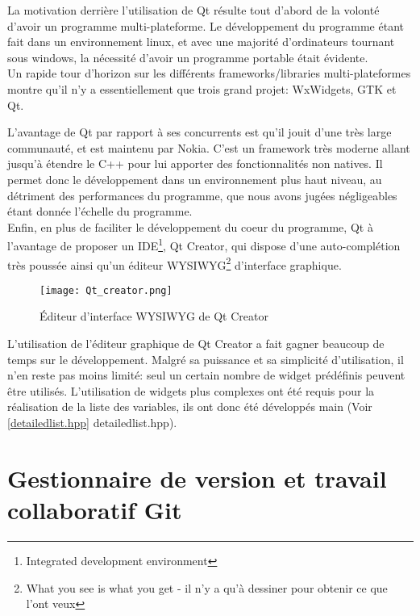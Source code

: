         La motivation derrière l'utilisation de Qt résulte tout d'abord de la volonté d'avoir un programme multi-plateforme. Le développement du programme étant fait dans un environnement linux, et avec une majorité d'ordinateurs tournant sous windows, la nécessité d'avoir un programme portable était évidente.
        \\ Un rapide tour d'horizon sur les différents frameworks/libraries multi-plateformes montre qu'il n'y a essentiellement que trois grand projet: WxWidgets, GTK et Qt.

    \newpage
        
        L'avantage de Qt par rapport à ses concurrents est qu'il jouit d'une très large communauté, et est maintenu par Nokia. C'est un framework très moderne allant jusqu'à étendre le C++ pour lui apporter des fonctionnalités non natives. Il permet donc le développement dans un environnement plus haut niveau, au détriment des performances du programme, que nous avons jugées négligeables étant donnée l'échelle du programme.
        \\ Enfin, en plus de faciliter le développement du coeur du programme, Qt à l'avantage de proposer un IDE\footnote{Integrated development environment}, Qt Creator, qui dispose d'une auto-complétion très poussée ainsi qu'un éditeur WYSIWYG\footnote{What you see is what you get - il n'y a qu'à dessiner pour obtenir ce que l'ont veux} d'interface graphique.

        \begin{figure}[h]
            \begin{center}
                \texttt{[image: Qt\_creator.png]}
            \end{center}

            \caption{Éditeur d'interface WYSIWYG de Qt Creator}
            \label{Qt Creator}
        \end{figure}

        L'utilisation de l'éditeur graphique de Qt Creator a fait gagner beaucoup de temps sur le développement. Malgré sa puissance et sa simplicité d'utilisation, il n'en reste pas moins limité: seul un certain nombre de widget prédéfinis peuvent être utilisés. L'utilisation de widgets plus complexes ont été requis pour la réalisation de la liste des variables, ils ont donc été développés main (Voir \ref{detailedlist.hpp} detailedlist.hpp).

    \newpage

    \section{Gestionnaire de version et travail collaboratif Git}
